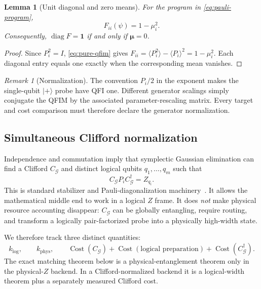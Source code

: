 \documentclass[11pt]{article}
\newtheorem{lemma}[lemma]{Lemma}
\theoremstyle{definition}
\theoremstyle{remark}
\newtheorem{remark}[remark]{Remark}
\newcommand{\G}{\mathcal{G}}
\newcommand{\diag}{\operatorname{diag}}
\newcommand{\phys}{\mathrm{phys}}
\newcommand{\logical}{\mathrm{log}}
\newcommand{\ket}[1]{\lvert #1\rangle}
\newcommand{\ones}{\mathbf{1}}
\begin{document}
\begin{lemma}[Unit diagonal and zero means]
\label{lem:unit-diag-zero-mean}
For the program in \cref{eq:pauli-program},
\begin{equation}
  F_{ii}(\psi)=1-\mu_i^2.
\end{equation}
Consequently, $\diag F=\ones$ if and only if $\bm\mu=0$.
\end{lemma}

\begin{proof}
Since $P_i^2=I$, \cref{eq:pure-qfim} gives $F_{ii}=\langle P_i^2\rangle-\langle P_i\rangle^2=1-\mu_i^2$. Each diagonal entry equals one exactly when the corresponding mean vanishes.
\end{proof}

\begin{remark}[Normalization]
The convention $P_i/2$ in the exponent makes the single-qubit $\ket{+}$ probe have QFI one. Different generator scalings simply conjugate the QFIM by the associated parameter-rescaling matrix. Every target and cost comparison must therefore declare the generator normalization.
\end{remark}

\subsection{Simultaneous Clifford normalization}
Independence and commutation imply that symplectic Gaussian elimination can find a Clifford $C_{\G}$ and distinct logical qubits $q_1,\ldots,q_m$ such that
\begin{equation}
  C_{\G}P_iC_{\G}^{\dagger}=Z_{q_i}.
  \label{eq:clifford-normalization}
\end{equation}
This is standard stabilizer and Pauli-diagonalization machinery~\cite{AaronsonGottesman2004,VanDenBergTemme2020,BravyiMaslov2021}. It allows the mathematical middle end to work in a logical $Z$ frame. It does \emph{not} make physical resource accounting disappear: $C_{\G}$ can be globally entangling, require routing, and transform a logically pair-factorized probe into a physically high-width state.

We therefore track three distinct quantities:
\begin{equation}
  k_{\logical},\qquad k_{\phys},\qquad
  \operatorname{Cost}(C_{\G})+
  \operatorname{Cost}(\text{logical preparation})+
  \operatorname{Cost}(C_{\G}^{\dagger}).
  \label{eq:three-resources}
\end{equation}
The exact matching theorem below is a physical-entanglement theorem only in the physical-$Z$ backend. In a Clifford-normalized backend it is a logical-width theorem plus a separately measured Clifford cost.
\end{document}
